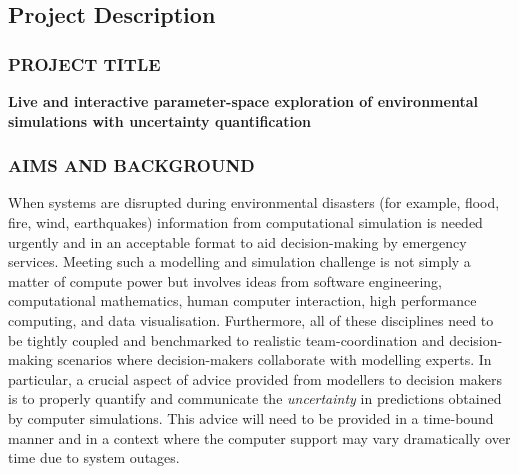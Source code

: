 \documentclass[a4paper,fontsize=12pt]{scrartcl}
\author{}
\date{\today}
\begin{document}
\renewcommand{\thesection}{\Alph{section}}

\setcounter{section}{3} %
\subsection{Project Description}
\label{sec:project-description}

\subsubsection*{PROJECT TITLE}

\textbf{Live and interactive parameter-space exploration of environmental simulations with uncertainty quantification} %



\subsubsection*{AIMS AND BACKGROUND}



When systems are disrupted during environmental disasters (for example,
flood, fire, wind, earthquakes) information from
computational simulation is needed urgently and in an
acceptable format to aid  decision-making by emergency services. 
Meeting such a modelling and simulation 
challenge is not simply a matter of compute power but involves
ideas from software engineering, computational mathematics,
human computer interaction, high performance computing, and data visualisation. Furthermore, all
of these disciplines need to be tightly coupled and benchmarked to
realistic  team-coordination and decision-making scenarios where decision-makers collaborate with modelling experts. 
In particular, 
a crucial aspect of advice provided from modellers to decision makers is to properly quantify and communicate 
the {\em uncertainty} in predictions obtained
by computer simulations. This advice will need to be provided in a time-bound manner and in a context where the computer support may vary dramatically over time due to system outages.
\end{document}

